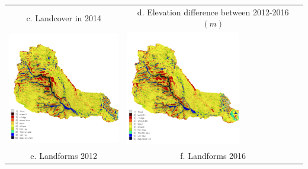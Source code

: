 \documentclass{standalone}
\begin{document}
\begin{tabular}{m{} m{}}
\multicolumn{1}{c}{c. Landcover in 2014} & \multicolumn{1}{c}{d. Elevation difference between 2012-2016 $(m)$}\\
%
\includegraphics[height=50mm,center]{../../images/sample_data/landforms_2012.png} &
\includegraphics[height=50mm,center]{../../images/sample_data/landforms_2016.png}\\
\multicolumn{1}{c}{e. Landforms 2012} & \multicolumn{1}{c}{f. Landforms 2016}\\
%
\end{tabular}
\end{document}
